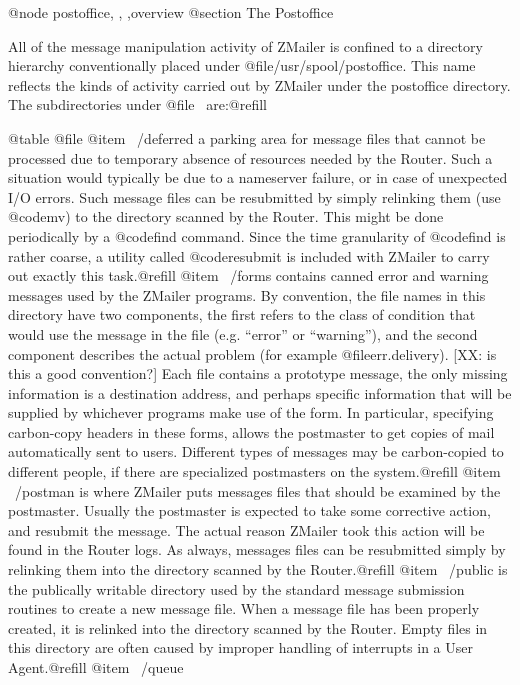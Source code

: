 @node postoffice, , ,overview
@section The Postoffice

All of the message manipulation activity of ZMailer is confined to a
directory hierarchy conventionally placed under @file{/usr/spool/postoffice}.
This name reflects the kinds of activity carried out by ZMailer under the
postoffice directory.  The subdirectories under @file{~} are:@refill

@table @file
@item ~/deferred
a parking area for message files that cannot be processed due to
temporary absence of resources needed by the Router.  Such a situation would
typically be due to a nameserver failure, or in case of unexpected I/O errors.
Such message files can be resubmitted by simply relinking them (use @code{mv})
to the directory scanned by the Router.  This might be done periodically by a
@code{find} command.  Since the time granularity of @code{find} is rather
coarse, a utility called @code{resubmit} is included with ZMailer to carry
out exactly this task.@refill
@item ~/forms
contains canned error and warning messages used by the ZMailer
programs.  By convention, the file names in this directory have two
components, the first refers to the class of condition that would use the
message in the file (e.g. ``error'' or ``warning''), and the second component
describes the actual problem (for example @file{err.delivery}). [XX: is this
a good convention?]  Each file contains a prototype message, the only missing
information is a destination address, and perhaps specific information
that will be supplied by whichever programs make use of the form.  In
particular, specifying carbon-copy headers in these forms, allows the
postmaster to get copies of mail automatically sent to users.  Different
types of messages may be carbon-copied to different people, if there are
specialized postmasters on the system.@refill
@item ~/postman
is where ZMailer puts messages files that should be examined by
the postmaster.  Usually the postmaster is expected to take some corrective
action, and resubmit the message.  The actual reason ZMailer took this action
will be found in the Router logs.  As always, messages files can be
resubmitted simply by relinking them into the directory scanned by the
Router.@refill
@item ~/public
is the publically writable directory used by the standard message
submission routines to create a new message file.  When a message file has
been properly created, it is relinked into the directory scanned by the
Router.  Empty files in this directory are often caused by improper handling
of interrupts in a User Agent.@refill
@item ~/queue
